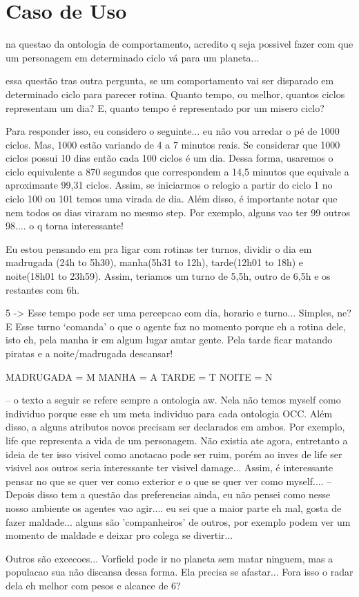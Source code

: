 \chapter{Caso de Uso} \label{ch:cdu}


na questao da ontologia de comportamento, acredito q seja possivel
fazer com que um personagem em determinado ciclo vá para um
planeta...

essa questão tras outra pergunta, se um comportamento vai ser
disparado em determinado ciclo para parecer rotina. Quanto tempo,
ou melhor, quantos ciclos representam um dia? E, quanto tempo
é representado por um misero ciclo?

Para responder isso, eu considero o seguinte... eu não vou arredar o
pé de 1000 ciclos. Mas, 1000 estão variando de 4 a 7 minutos reais.
Se considerar que 1000 ciclos possui 10 dias então cada 100 ciclos é um dia.
Dessa forma, usaremos o ciclo equivalente a 870 segundos que correspondem
a 14,5 minutos que equivale a aproximante 99,31 ciclos. Assim, se iniciarmos
o relogio a partir do ciclo 1 no ciclo 100 ou 101 temos uma virada de dia.
Além disso, é importante notar que nem todos os dias viraram no mesmo step.
Por exemplo, alguns vao ter 99 outros 98.... o q torna interessante!

Eu estou pensando em pra ligar com rotinas ter turnos, dividir o dia em
madrugada (24h to 5h30), manha(5h31 to 12h), tarde(12h01 to 18h) e
noite(18h01 to 23h59). Assim, teriamos um turno de 5,5h, outro de 6,5h e os
restantes com 6h.

5 -> Esse tempo pode ser uma percepcao com dia, horario e turno... Simples,
ne?
       E Esse turno `comanda' o que o agente faz no momento porque eh a rotina
       dele, isto eh, pela manha ir em algum lugar amtar gente. Pela tarde
ficar
       matando piratas e a noite/madrugada descansar!

MADRUGADA = M
MANHA = A
TARDE = T
NOITE = N

--
o texto a seguir se refere sempre a ontologia aw.
Nela não temos myself como individuo porque esse
eh um meta individuo para cada ontologia OCC.
Além disso, a alguns atributos novos precisam ser
declarados em ambos. Por exemplo, life que representa
a vida de um personagem. Não existia ate agora,
entretanto a ideia de ter isso visivel como anotacao
pode ser ruim, porém ao inves de life ser visivel aos
outros seria interessante ter visivel damage...
Assim, é interessante pensar no que se quer ver
como exterior e o que se quer ver como myself....
--
Depois disso tem a questão das preferencias ainda,
eu não pensei como nesse nosso ambiente os agentes
vao agir.... eu sei que a maior parte eh mal, gosta de
fazer maldade... alguns são 'companheiros' de outros,
por exemplo podem ver um momento de maldade e
deixar pro colega se divertir...

Outros são excecoes... Vorfield pode ir no planeta
sem matar ninguem, mas a populacao sua não discansa
dessa forma. Ela precisa se afastar... Fora isso o radar dela
 eh melhor com pesos e alcance de 6?

